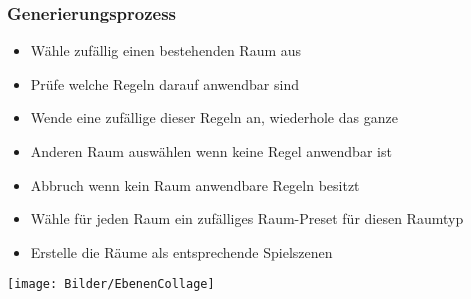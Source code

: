 \begin{frame}
\frametitle{Generierungsprozess}

\begin{itemize}
\item Wähle zufällig einen bestehenden Raum aus
\item Prüfe welche Regeln darauf anwendbar sind
\item Wende eine zufällige dieser Regeln an, wiederhole das ganze
\item Anderen Raum auswählen wenn keine Regel anwendbar ist
\item Abbruch wenn kein Raum anwendbare Regeln besitzt
\item Wähle für jeden Raum ein zufälliges Raum-Preset für diesen Raumtyp
\item Erstelle die Räume als entsprechende Spielszenen
\end{itemize}

\end{frame}

\begin{frame}
\texttt{[image: Bilder/EbenenCollage]}
\end{frame}

